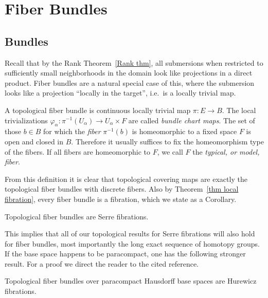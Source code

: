 
\chapter{Fiber Bundles}\label{chap: Fiber bundles}

\section{Bundles}

Recall that by the Rank Theorem~\ref{Rank thm}, all submersions when restricted to sufficiently small neighborhoods in the domain look like projections in a direct product. Fiber bundles are a natural special case of this, where the submersion looks like a projection ``locally in the target'', i.e.~is a locally trivial map. 

\begin{defn}
    A topological fiber bundle is continuous locally trivial map $\pi:E\to B$. The local trivializations $\varphi_\alpha:\pi^{-1}(U_\alpha)\to U_\alpha\times F$ are called \emph{bundle chart maps}. The set of those $b\in B$ for which the \emph{fiber} $\pi^{-1}(b)$ is homeomorphic to a fixed space $F$ is open and closed in $B$. Therefore it usually suffices to fix the homeomorphism type of the fibers. If all fibers are homeomorphic to $F$, we call $F$ the \emph{typical, or model, fiber}.
\end{defn}

From this definition it is clear that topological covering maps are exactly the topological fiber bundles with discrete fibers. Also by Theorem~\ref{thm local fibration}, every fiber bundle is a fibration, which we state as a Corollary. 

\begin{cor}[{{\cite[Cor.~3.2.5]{RS2}}}]
    Topological fiber bundles are Serre fibrations.
\end{cor}

This implies that all of our topological results for Serre fibrations will also hold for fiber bundles, most importantly the long exact sequence of homotopy groups. If the base space happens to be paracompact, one has the following stronger result. For a proof we direct the reader to the cited reference.

\begin{cor}
    Topological fiber bundles over paracompact Hausdorff base spaces are Hurewicz fibrations.
\end{cor}

